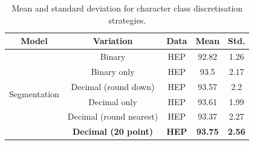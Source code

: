 \begin{table}[h]
\begin{center}
\begin{tabular}{|c|c|c|c|c|}
\hline
Model & Variation & Data & Mean & Std.\\
\hline
\multirow{6}{*}{Segmentation} & Binary & HEP & 92.82 & 1.26\\\cline{2-5}
& Binary only & HEP & 93.5 & 2.17\\\cline{2-5}
& Decimal (round down) & HEP & 93.57 & 2.2\\\cline{2-5}
& Decimal only & HEP & 93.61 & 1.99\\\cline{2-5}
& Decimal (round nearest) & HEP & 93.37 & 2.27\\\cline{2-5}
& \textbf{Decimal (20 point)} & \textbf{HEP} & \textbf{93.75} & \textbf{2.56}\\\cline{2-5}
\hline
\end{tabular}
\caption{Mean and standard deviation for character class discretisation strategies.}
\label{table:characterclassresults}
\end{center}
\end{table}



